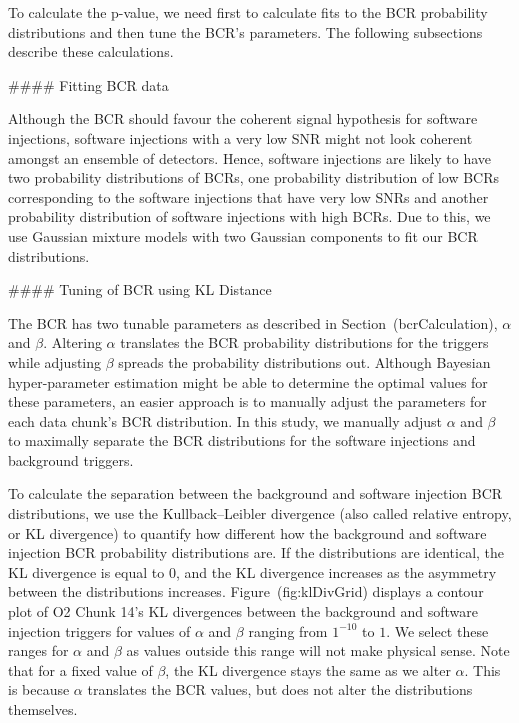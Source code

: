 {{{{{{{To calculate the p-value, we need first to calculate fits to the BCR probability
distributions and then tune the BCR's parameters. The following subsections describe these calculations.


#### Fitting BCR data

Although the BCR should favour the coherent signal hypothesis for software injections,
software injections with a very low SNR might not look coherent amongst an ensemble of
detectors. Hence, software injections are likely to have two probability distributions
of BCRs, one probability distribution of low BCRs corresponding to the software
injections that have very low SNRs and another probability distribution of software
injections with high BCRs. Due to this, we use Gaussian mixture models with two Gaussian
components to fit our BCR  distributions.

#### Tuning of BCR using KL Distance

The BCR has two tunable parameters as described in Section~\@ref(bcrCalculation),
$\alpha$ and $\beta$. Altering $\alpha$ translates the BCR probability distributions for
the triggers while adjusting $\beta$ spreads the probability distributions out. Although
Bayesian hyper-parameter estimation might be able to determine the optimal values for
these parameters, an easier approach is to manually adjust the parameters for each data
chunk's BCR distribution. In this study, we manually adjust $\alpha$ and $\beta$ to
maximally separate the BCR distributions for the software injections and background
triggers.

To calculate the separation between the background and software injection BCR
distributions, we use the Kullback–Leibler divergence (also called relative entropy, or
KL divergence) to quantify how different how the background and software injection  BCR
probability distributions are. If the distributions are identical, the KL divergence is
equal to 0, and the KL divergence increases as the asymmetry between the distributions
increases. Figure~\@ref(fig:klDivGrid) displays a contour plot of O2 Chunk 14's KL
divergences between the background and software injection triggers for values of 
$\alpha$  and $\beta$ ranging from $1^{-10}$ to $1$. We select these ranges for $\alpha$
and $\beta$ as values outside this range will not make physical sense. Note that for a
fixed value of $\beta$, the KL divergence stays the same as we alter $\alpha$. This is
because $\alpha$ translates the BCR values, but does not alter the distributions
themselves.

}}}}}}}
